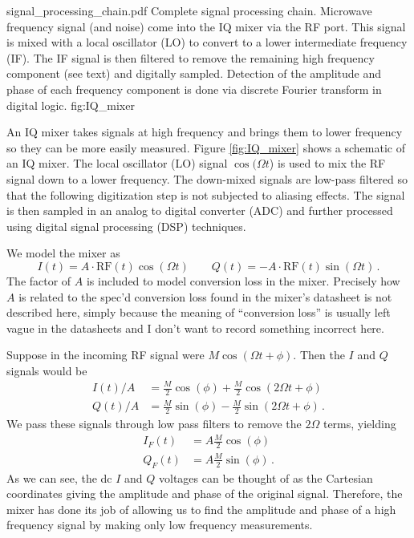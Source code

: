 
{signal_processing_chain.pdf}
{Complete signal processing chain. Microwave frequency signal (and noise) come into the IQ mixer via the RF port. This signal is mixed with a local oscillator (LO) to convert to a lower intermediate frequency (IF). The IF signal is then filtered to remove the remaining high frequency component (see text) and digitally sampled. Detection of the amplitude and phase of each frequency component is done via discrete Fourier transform in digital logic.}
{fig:IQ_mixer}

An IQ mixer takes signals at high frequency and brings them to lower frequency so they can be more easily measured.
Figure \ref{fig:IQ_mixer} shows a schematic of an IQ mixer.
The local oscillator (LO) signal $\cos(\Omega t$) is used to mix the RF signal down to a lower frequency.
The down-mixed signals are low-pass filtered so that the following digitization step is not subjected to aliasing effects.
The signal is then sampled in an analog to digital converter (ADC) and further processed using digital signal processing (DSP) techniques.

We model the mixer as
\begin{equation}
I(t) = A \cdot \text{RF}(t) \cos(\Omega t) \qquad
Q(t) = -A \cdot \text{RF}(t) \sin(\Omega t) \, .
\end{equation}
The factor of $A$ is included to model conversion loss in the mixer.
Precisely how $A$ is related to the spec'd conversion loss found in the mixer's datasheet is not described here, simply because the meaning of ``conversion loss'' is usually left vague in the datasheets and I don't want to record something incorrect here.


Suppose in the incoming RF signal were $M \cos(\Omega t + \phi)$.
Then the $I$ and $Q$ signals would be
\begin{align}
I(t)/A &= \frac{M}{2} \cos(\phi) + \frac{M}{2} \cos(2\Omega t + \phi) \\
Q(t)/A &= \frac{M}{2} \sin(\phi) - \frac{M}{2} \sin(2\Omega t + \phi) \, .
\end{align}
We pass these signals through low pass filters to remove the $2 \Omega$ terms, yielding
\begin{align}
I_F(t) &= A \frac{M}{2} \cos(\phi) \\
Q_F(t) &= A \frac{M}{2} \sin(\phi) \, .
\end{align}
As we can see, the dc $I$ and $Q$ voltages can be thought of as the Cartesian coordinates giving the amplitude and phase of the original signal.
Therefore, the mixer has done its job of allowing us to find the amplitude and phase of a high frequency signal by making only low frequency measurements.


